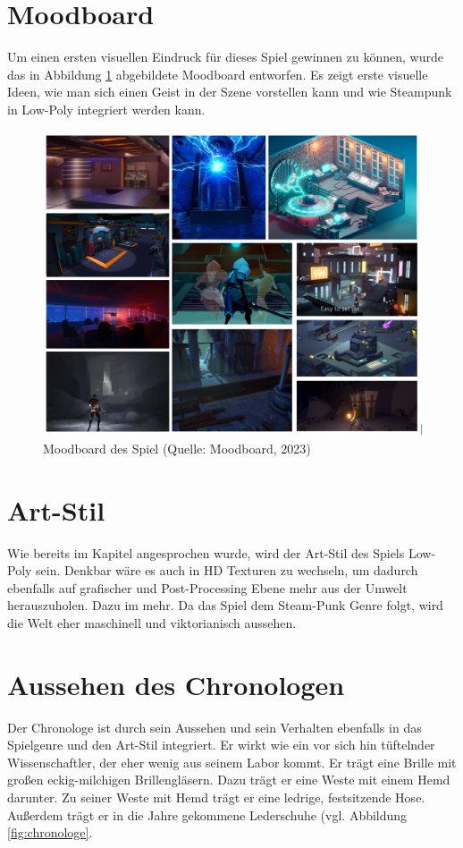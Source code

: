 \section{Moodboard}\label{sec:moodboard}
Um einen ersten visuellen Eindruck für dieses Spiel gewinnen  zu können, wurde das in Abbildung \ref{fig:moodboard} abgebildete Moodboard entworfen. Es zeigt erste visuelle Ideen, wie man sich einen Geist in der Szene vorstellen kann und wie Steampunk in Low-Poly integriert werden kann.

\begin{figure}[ht]
\centering
\includegraphics[width=0.8\linewidth]{content/pictures/Game_Atmo.jpg}
\caption{Moodboard des Spiel (Quelle: Moodboard, 2023)}
\label{fig:moodboard}
\end{figure}


\section{Art-Stil}
Wie bereits im Kapitel  angesprochen wurde, wird der Art-Stil des Spiels Low-Poly sein. Denkbar wäre es auch in \ac{HD} Texturen zu wechseln, um dadurch ebenfalls auf grafischer und Post-Processing Ebene mehr aus der Umwelt herauszuholen. Dazu im  mehr. Da das Spiel dem Steam-Punk Genre folgt, wird die Welt eher maschinell und viktorianisch aussehen.

\section{Aussehen des Chronologen}
Der Chronologe ist durch sein Aussehen und sein Verhalten ebenfalls in das Spielgenre und den Art-Stil integriert. Er wirkt wie ein vor sich hin tüftelnder Wissenschaftler, der eher wenig aus seinem Labor kommt. Er trägt eine Brille mit großen eckig-milchigen Brillengläsern. Dazu trägt er eine Weste mit einem Hemd darunter. Zu seiner Weste mit Hemd trägt er eine ledrige, festsitzende Hose. Außerdem trägt er in die Jahre gekommene Lederschuhe (vgl. Abbildung \ref{fig:chronologe}.

